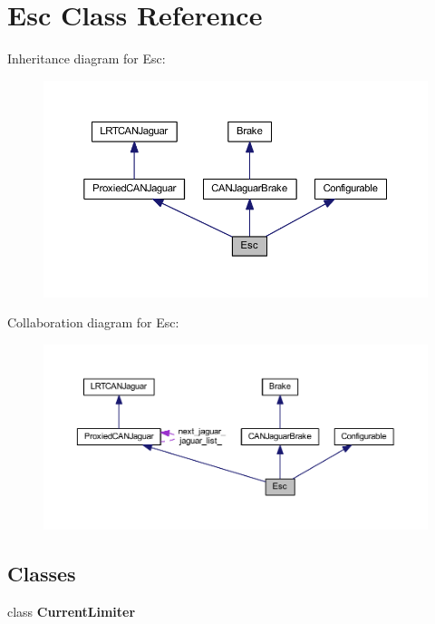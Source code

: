 \hypertarget{class_esc}{
\section{\-Esc \-Class \-Reference}
\label{class_esc}
}


\-Inheritance diagram for \-Esc\-:\nopagebreak
\begin{figure}[H]
\begin{center}
\leavevmode
\includegraphics[width=350pt]{class_esc__inherit__graph}
\end{center}
\end{figure}


\-Collaboration diagram for \-Esc\-:\nopagebreak
\begin{figure}[H]
\begin{center}
\leavevmode
\includegraphics[width=350pt]{class_esc__coll__graph}
\end{center}
\end{figure}
\subsection*{\-Classes}
\begin{DoxyCompactItemize}
\item 
class {\bfseries \-Current\-Limiter}
\end{DoxyCompactItemize}
